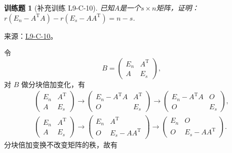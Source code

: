 \documentclass[12pt,fontset=fandol]{ctexart}
\newtheorem{exercise}{训练题}[section]
\begin{document}
\begin{exercise}[补充训练 L9-C-10]\label{prob:L9-C-10}
已知$A$是一个$s \times n$矩阵，证明：$r(E_n-A^\mathrm{T}A)-r(E_s-AA^\mathrm{T})=n-s$.
\end{exercise}
\noindent 来源：\href{https://github.com/yhwu-is/Linear-Algebra-Left-Undone/blob/new/%E8%AE%B2%E4%B9%89/%E4%B8%93%E9%A2%98/9%20%E7%9F%A9%E9%98%B5%E8%BF%90%E7%AE%97%E8%BF%9B%E9%98%B6.tex}{L9-C-10}。
\begin{solve}
令
            \[
                B = \begin{pmatrix}
                    E_n & A^\mathrm{T} \\
                    A   & E_s
                \end{pmatrix},
            \]
            对 $B$ 做分块倍加变化，有
            \begin{gather*}
                \begin{pmatrix}
                    E_n & A^\mathrm{T} \\
                    A   & E_s
                \end{pmatrix} \to \begin{pmatrix}
                    E_n - A^\mathrm{T}A & A^\mathrm{T} \\
                    O                   & E_s
                \end{pmatrix} \to \begin{pmatrix}
                    E_n - A^\mathrm{T}A & O   \\
                    O                   & E_s
                \end{pmatrix}, \\
                \begin{pmatrix}
                    E_n & A^\mathrm{T} \\
                    A   & E_s
                \end{pmatrix} \to \begin{pmatrix}
                    E_n & A^\mathrm{T}        \\
                    O   & E_s - AA^\mathrm{T}
                \end{pmatrix} \to \begin{pmatrix}
                    E_n & O                   \\
                    O   & E_s - AA^\mathrm{T}
                \end{pmatrix}.
            \end{gather*}
            分块倍加变换不改变矩阵的秩，故有

\end{solve}
\end{document}
